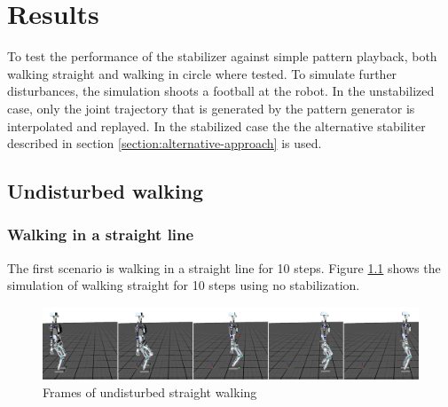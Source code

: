\documentclass[english,ngerman]{KITreprt}
\begin{document}
\chapter{Results}\label{results}

To test the performance of the stabilizer against simple pattern
playback, both walking straight and walking in circle where tested. To
simulate further disturbances, the simulation shoots a football at the
robot. In the unstabilized case, only the joint trajectory that is
generated by the pattern generator is interpolated and replayed. In the
stabilized case the the alternative stabiliter described in section
\ref{section:alternative-approach} is used.

\section{Undisturbed walking}\label{undisturbed-walking}

\subsection{Walking in a straight
line}\label{walking-in-a-straight-line}

The first scenario is walking in a straight line for 10 steps. Figure
\ref{img:player-undisturbed-straight-thumbs} shows the simulation of
walking straight for 10 steps using no stabilization.

\begin{figure}[H]
\vspace*{-1em}
\includegraphics[width=\textwidth]{images/undisturbed_straight_thumbs.png}
\caption{Frames of undisturbed straight walking}
\label{img:player-undisturbed-straight-thumbs}
\end{figure}
\end{document}
